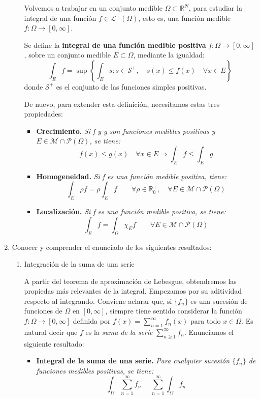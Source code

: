 \documentclass[a4paper, 12pt]{article}
\begin{document}
\begin{enumerate}[label=\textbf{\arabic*}.]
\begin{enumerate}[label=\textit{\alph*)}]
	Volvemos a trabajar en un conjunto medible \(\Omega \subset \mathbb{R}^N\), para estudiar la integral de una función \(f \in \mathcal{L}^+ (\Omega)\), esto es, una función medible \(f: \Omega \to [0, \infty]\).
	
	Se define la \textbf{integral de una función medible positiva} \(f: \Omega \to [0, \infty]\), sobre un conjunto medible \(E \subset \Omega\), mediante la igualdad:
	\begin{equation}\label{tres}
		\int_E f = \sup \left\{ \int_E s: s \in \mathcal{S}^+, \quad s(x) \leq f(x) \quad \forall x \in E \right\}
	\end{equation}
	donde \(\mathcal{S}^+\) es el conjunto de las funciones simples positivas.
	
	De nuevo, para extender esta definición, necesitamos estas tres propiedades:
	\begin{itemize}
		\item \textbf{Crecimiento.} \textit{Si f y g son funciones medibles positivas y \(E \in \mathcal{M} \cap \mathcal{P}(\Omega)\), se tiene:}
		\[
			f(x) \leq g(x) \quad \forall x \in E \Rightarrow \int_E f \leq \int_E g
		\]
		
		\item \textbf{Homogeneidad.} \textit{Si f es una función medible positiva, tiene:}
		\[
			\int_E \rho f = \rho \int_E f \qquad \forall \rho \in  \mathbb{R}_0^+, \quad \forall E \in \mathcal{M} \cap \mathcal{P}(\Omega)
		\]
		
		\item \textbf{Localización.} \textit{Si f es una función medible positiva, se tiene:}
		\[
			\int_E f = \int_{\Omega} \chi_E f \qquad \forall E \in \mathcal{M} \cap \mathcal{P} (\Omega)
		\]
	\end{itemize}
\end{enumerate}

\item Conocer y comprender el enunciado de los siguientes resultados:

\begin{enumerate}[label=\textit{\alph*)}]
	\item Integración de la suma de una serie
	
	A partir del teorema de aproximación de Lebesgue, obtendremos las propiedas más relevantes de la integral. Empezamos por su aditividad respecto al integrando. Conviene aclarar que, si \(\{f_n\}\) es una sucesión de funciones de \(\Omega\) en \([0, \infty]\), siempre tiene sentido considerar la función \(f: \Omega \to [0, \infty]\) definida por \(f(x) = \sum_{n=1}^{\infty} f_n(x)\) para todo \(x \in \Omega\). Es natural decir que \(f\) es la \textit{suma de la serie} \(\sum_{n \geq 1}^{\infty} f_n\). Enunciamos el siguiente resultado:
	\begin{itemize}
		\item \textbf{Integral de la suma de una serie.} \textit{Para cualquier sucesión \(\{f_n\}\) de funciones medibles positivas, se tiene:}
		\[
			\int_{\Omega} \sum_{n=1}^{\infty} f_n = \sum_{n=1}^{\infty} \int_{\Omega} f_n
		\]
	\end{itemize}
	

\end{enumerate}
\end{enumerate}
\end{document}
